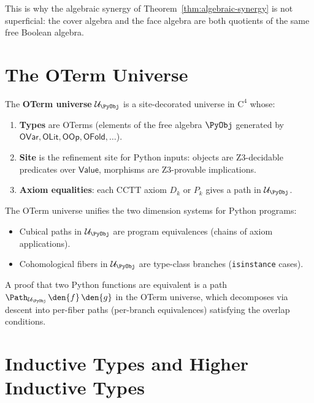 This is why the algebraic synergy of Theorem~\ref{thm:algebraic-synergy}
is not superficial: the cover algebra and the face algebra are both
quotients of the same free Boolean algebra.


\section{The OTerm Universe}
\label{sec:oterm-universe}

\begin{definition}
The \textbf{OTerm universe} \(\mathcal{U}_\PyObj\) is a
site-decorated universe in \(\mathrm{C}^4\) whose:
\begin{enumerate}
\item \textbf{Types} are OTerms (elements of the free algebra
  \(\PyObj\) generated by \(\mathsf{OVar}, \mathsf{OLit}, \mathsf{OOp},
  \mathsf{OFold}, \ldots\)).
\item \textbf{Site} is the refinement site for Python inputs:
  objects are Z3-decidable predicates over \(\mathsf{Value}\),
  morphisms are Z3-provable implications.
\item \textbf{Axiom equalities}: each CCTT axiom
  \(D_k\) or \(P_k\) gives a path in \(\mathcal{U}_\PyObj\).
\end{enumerate}
\end{definition}

The OTerm universe unifies the two dimension systems for Python programs:
\begin{itemize}
\item Cubical paths in \(\mathcal{U}_\PyObj\) are program equivalences
  (chains of axiom applications).
\item Cohomological fibers in \(\mathcal{U}_\PyObj\) are type-class
  branches (\texttt{isinstance} cases).
\end{itemize}

A proof that two Python functions are equivalent is a path
\(\Path_{\mathcal{U}_\PyObj}\, \den{f}\, \den{g}\) in the OTerm
universe, which decomposes via descent into per-fiber paths
(per-branch equivalences) satisfying the overlap conditions.


\section{Inductive Types and Higher Inductive Types}
\label{sec:inductive-types}

